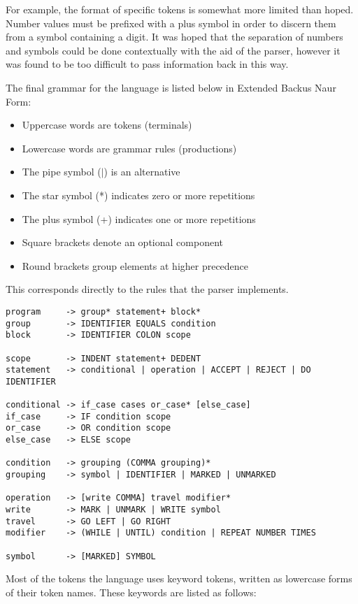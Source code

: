 \documentclass[11pt]{article}
\begin{document}
For example, the format of specific tokens is somewhat more limited than hoped. Number values must be prefixed with a plus symbol in order to discern them from a symbol containing a digit. It was hoped that the separation of numbers and symbols could be done contextually with the aid of the parser, however it was found to be too difficult to pass information back in this way.

The final grammar for the language is listed below in Extended Backus Naur Form:
\begin{itemize}
    \item Uppercase words are tokens (terminals)
    \item Lowercase words are grammar rules (productions)
    \item The pipe symbol ($\vert$) is an alternative
    \item The star symbol (*) indicates zero or more repetitions
    \item The plus symbol (+) indicates one or more repetitions
    \item Square brackets denote an optional component
    \item Round brackets group elements at higher precedence
\end{itemize}
This corresponds directly to the rules that the parser implements.

\begin{verbatim}
program     -> group* statement+ block*
group       -> IDENTIFIER EQUALS condition
block       -> IDENTIFIER COLON scope

scope       -> INDENT statement+ DEDENT
statement   -> conditional | operation | ACCEPT | REJECT | DO IDENTIFIER

conditional -> if_case cases or_case* [else_case]
if_case     -> IF condition scope
or_case     -> OR condition scope
else_case   -> ELSE scope

condition   -> grouping (COMMA grouping)*
grouping    -> symbol | IDENTIFIER | MARKED | UNMARKED

operation   -> [write COMMA] travel modifier*
write       -> MARK | UNMARK | WRITE symbol
travel      -> GO LEFT | GO RIGHT
modifier    -> (WHILE | UNTIL) condition | REPEAT NUMBER TIMES

symbol      -> [MARKED] SYMBOL
\end{verbatim}

Most of the tokens the language uses keyword tokens, written as lowercase forms of their token names. These keywords are listed as follows:
\end{document}
